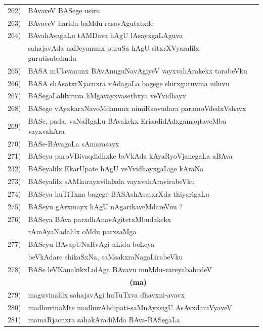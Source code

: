 {\begin{longtable}{@{}cp{7.4cm}r}
262) & BAvaveV BASege usiru & \pageref{page9}\\
263) & BAvaveV haridu baMdu rasavAgutatxde & \pageref{page229}\\
264) & BAvahAvagaLu tAMDava hAgU lAsayxgaLAguva & \\
     & sahajavAda naDeyanunx puruSa hAgU sitxrXVyaralilx gurutisabahudu & \pageref{page226}\\
265) & BASA mUlavanunx BAvAnuguNavAgiyeV vayxvahArakekx tarabeVku & \pageref{page10a}\\
266) & BASA shAsatxrXjacnxra vAdagaLa bagege shirxguruvina niluvu & \pageref{page05}\\
267) & BASegaLalilxruva liMgavayxvasethxya veYvidhayx & \pageref{page17}\\
268) & BASege vAyxkaraNavoMdanunx nimiRsuvudara paramoVdedxVshayx & \pageref{page34}\\
269) & BASe, pada, vaNaRgaLu BAvakekx ErisadidAdxgamaqtaveMba vayxvahAra & \pageref{page185}\\
270) & BASe-BAvagaLa sAmarasayx & \pageref{page24}\\
271) & BASeya puroVBivaqdidhxke beVkAda kAyaRyoVjanegaLa aBAva & \pageref{page31}\\
232) & BASeyalilx EkarUpate hAgU veYvidhayxgaLige kAraNa & \pageref{page11b}\\
273) & BASeyalilx sAMkarayxvilalxda vayxvahAravirabeVku & \pageref{page174}\\  
274) & BASeya huTiTxna bagege BASAshAsatxrXda thiyarigaLu & \pageref{page3a}\\
275) & BASeyu gArxmayx hAgU nAgarikaveMdareVnu ? & \pageref{page11a}\\
276) & BASeya BAva parxdhAnavAgitetxMbudakekx & \\
     & rAmAyaNadalilx oMdu parxsaMga & \pageref{page13}\\
277) & BASeyu BAvapUNaRvAgi uLidu beLeya  & \\
     & beVkAdare shikaSxNa, saMsakxraNagaLirabeVku & \pageref{page16}\\
278) & BASe leVKanakikxLidAga BAvavu muMdu-vareyabahudeV & \pageref{page186}\\[0.3cm]
     &  \multicolumn{1}{c}{\textbf{(ma)}} & \\[0.3cm]
279) & maguvinalilx sahajavAgi huTuTxva dhavxni-avavx & \pageref{page6}\\
280) & madhuvinaMte madhurAhdipati-saMnAyxsigU AsAvxdaniVyaveV & \pageref{page283}\\
281) & mamaRjacnxra sahakAradiMda BAva-BASegaLa &  \\

\end{longtable}}
